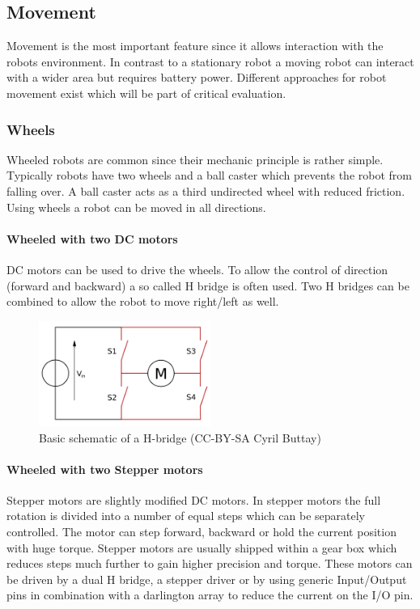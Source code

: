\documentclass[11pt,a4paper]{article}
\begin{document}
\subsection{Movement}
Movement is the most important feature since it allows interaction with the robots environment. In contrast to a stationary robot a moving robot can interact with a wider area but requires battery power. Different approaches for robot movement exist which will be part of critical evaluation.
\subsubsection{Wheels}
Wheeled robots are common since their mechanic principle is rather simple. Typically robots have two wheels and a ball caster which prevents the robot from falling over. A ball caster acts as a third undirected wheel with reduced friction. Using wheels a robot can be moved in all directions.
\paragraph{Wheeled with two DC motors}
DC motors can be used to drive the wheels. To allow the control of direction (forward and backward) a so called H bridge is often used. Two H bridges can be combined to allow the robot to move right/left as well. 
\begin{figure}[h!]
  \centering
  \includegraphics[width=0.5\textwidth]{images/hbridge.png}
  \caption{Basic schematic of a H-bridge (CC-BY-SA Cyril Buttay)}
\end{figure}
\paragraph{Wheeled with two Stepper motors}
Stepper motors are slightly modified DC motors. In stepper motors the full rotation is divided into a number of equal steps which can be separately controlled. The motor can step forward, backward or hold the current position with huge torque. Stepper motors are usually shipped within a gear box which reduces steps much further to gain higher precision and torque. 
These motors can be driven by a dual H bridge, a stepper driver or by using generic Input/Output pins in combination with a darlington array to reduce the current on the I/O pin. 
\end{document}
